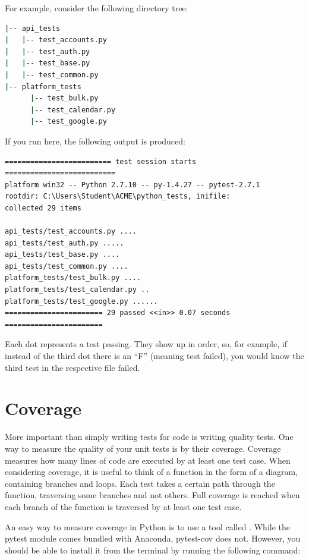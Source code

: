 For example, consider the following directory tree:

\begin{lstlisting}[language=bash]
|-- api_tests
|   |-- test_accounts.py
|   |-- test_auth.py
|   |-- test_base.py
|   |-- test_common.py
|-- platform_tests
      |-- test_bulk.py
      |-- test_calendar.py
      |-- test_google.py
\end{lstlisting}

If you run  here, the following output is produced:

\begin{lstlisting}
========================= test session starts ==========================
platform win32 -- Python 2.7.10 -- py-1.4.27 -- pytest-2.7.1
rootdir: C:\Users\Student\ACME\python_tests, inifile:
collected 29 items

api_tests/test_accounts.py ....
api_tests/test_auth.py .....
api_tests/test_base.py ....
api_tests/test_common.py ....
platform_tests/test_bulk.py ....
platform_tests/test_calendar.py ..
platform_tests/test_google.py ......
======================= 29 passed <<in>> 0.07 seconds =======================
\end{lstlisting}

Each dot represents a test passing. They show up in order, so, for example, if instead of the third dot there is an ``F'' (meaning test failed), you would know the third test in the respective file failed.

\section*{Coverage} %

More important than simply writing tests for code is writing quality tests. One way to measure the quality of your unit tests is by their coverage. Coverage measures how many lines of code are executed by at least one test case.
When considering coverage, it is useful to think of a function in the form of a diagram, containing branches and loops. Each test takes a certain path through the function, traversing some branches and not others. Full coverage is reached when each branch of the function is traversed by at least one test case.

An easy way to measure coverage in Python is to use a tool called . While the pytest module comes bundled with Anaconda, pytest-cov does not.  However, you should be able to install it from the terminal by running the following command:

